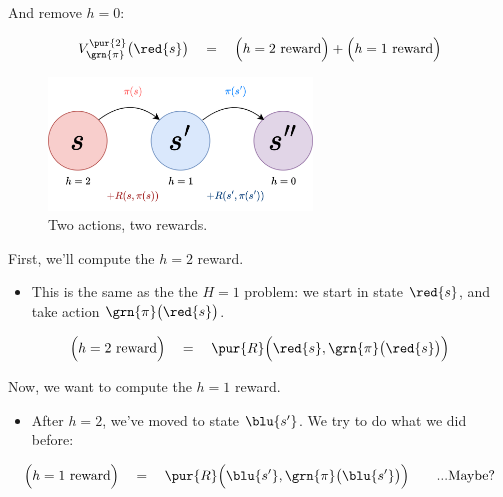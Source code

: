         And remove $h=0$:

        \begin{equation*}
            V_{\grn{\pi}}^{\pur{2}}\big(\red{s} \big) \quad=\quad 
            \Big(h=2 \text{ reward}\Big)
            +
            \Big(h=1 \text{ reward}\Big)
        \end{equation*}

        \begin{figure}[H]
            \centering
            \includegraphics[width=70mm,scale=0.5]{images/mdp_images/horizon_2.png}
            
            \caption*{Two actions, two rewards.}
        \end{figure}

        \subsecdiv

        First, we'll compute the $h=2$ reward.

        \begin{itemize}
            \item This is the same as the the $H=1$ problem: we start in state $\red{s}$, and take action $\grn{\pi}\big(\red{s}\big)$.
        \end{itemize}

        \begin{equation}
            \Big(h=2 \text{ reward}\Big) \quad=\quad 
            \pur{R} \Big( \red{s},\grn{\pi}\big(\red{s}\big) \Big)
        \end{equation}

        \subsecdiv

        Now, we want to compute the $h=1$ reward.

        \begin{itemize}
            \item After $h=2$, we've moved to state $\blu{s'}$. We try to do what we did before:
        \end{itemize}

        \begin{equation}
            \Big(h=1 \text{ reward}\Big) \quad=\quad 
            \pur{R} \Big( \blu{s'},\grn{\pi}\big(\blu{s'}\big) \Big) 
            \qquad \text{...Maybe?}
        \end{equation}


